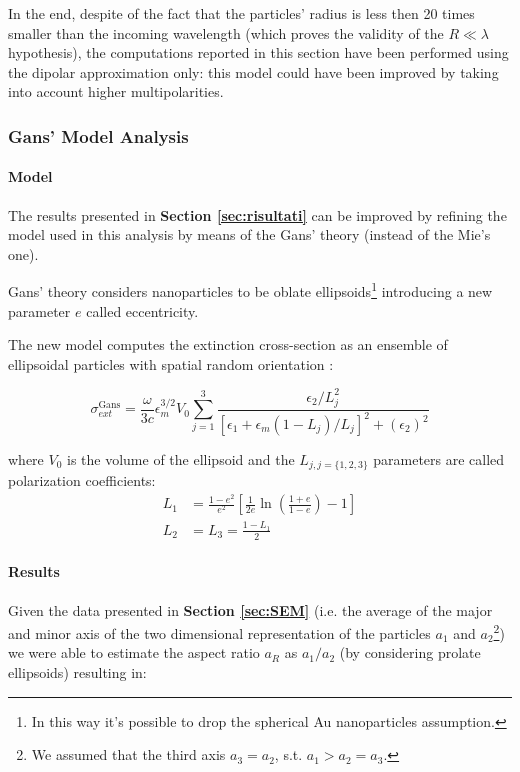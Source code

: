 \documentclass[twocolumn]{article}
\begin{document}
\begin{multicols}{2}
In the end, despite of the fact that the particles' radius is less then 20 times smaller than the incoming wavelength (which proves the validity of the $R\ll \lambda$ hypothesis), the computations reported in this section have been performed  using the dipolar approximation only: this model could have been improved by taking into account higher multipolarities.

\subsubsection{Gans' Model Analysis}
\paragraph{Model}
The results presented in \textbf{Section \ref{sec:risultati}} can be improved by refining the model used in this analysis by means of the Gans' theory (instead of the Mie's one).

Gans' theory considers nanoparticles to be oblate ellipsoids\footnote{In this way it's possible to drop the spherical Au nanoparticles assumption.} introducing a new parameter $e$ called eccentricity.

\noindent
The new model computes the extinction cross-section as an ensemble of ellipsoidal particles with spatial random orientation \cite{mattei}:

\begin{equation*}
\sigma_{ext}^{\text{Gans}} = \frac{\omega}{3c} \epsilon_m^{3/2}V_{0} \sum^{3}_{j=1}{\frac{\epsilon_2/L_j^2}{[\epsilon_1 + \epsilon_m(1-L_j)/L_j]^2 + (\epsilon_2)^2}}
\end{equation*}

\noindent
where $V_0$ is the volume of the ellipsoid and the $L_{j,j=\{1,2,3\}}$ parameters are called polarization coefficients:
\begin{align*}
L_{1}&=\frac{1-e^{2}}{e^{2}}\left[\frac{1}{2 e} \ln \left(\frac{1+e}{1-e}\right)-1\right]\\
L_{2}&=L_{3}=\frac{1-L_{1}}{2}
\end{align*}

\paragraph{Results}
Given the data presented in \textbf{Section \ref{sec:SEM}} (i.e. the average of the major
and minor axis of the two dimensional representation of the particles $a_1$ and $a_2$\footnote{We assumed that the third axis $a_3=a_2$, s.t. $a_1>a_2=a_3$.}) we were able to estimate the aspect ratio $a_R$ as  $a_1/a_2$ (by considering prolate ellipsoids) resulting in:


\end{multicols}
\end{document}
